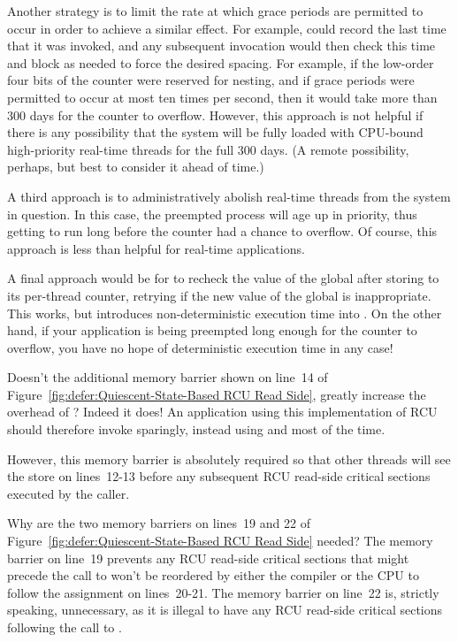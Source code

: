 \begin{enumerate}
	Another strategy is to limit the rate at which grace periods are
	permitted to occur in order to achieve a similar effect.
	For example,  could record the last time
	that it was invoked, and any subsequent invocation would then
	check this time and block as needed to force the desired
	spacing.
	For example, if the low-order four bits of the counter were
	reserved for nesting, and if grace periods were permitted to
	occur at most ten times per second, then it would take more
	than 300 days for the counter to overflow.
	However, this approach is not helpful if there is any possibility
	that the system will be fully loaded with CPU-bound high-priority
	real-time threads for the full 300 days.
	(A remote possibility, perhaps, but best to consider it ahead
	of time.)

	A third approach is to administratively abolish real-time threads
	from the system in question.
	In this case, the preempted process will age up in priority,
	thus getting to run long before the counter had a chance to
	overflow.
	Of course, this approach is less than helpful for real-time
	applications.

	A final approach would be for  to recheck
	the value of the global  after storing to its
	per-thread  counter, retrying if the new
	value of the global  is inappropriate.
	This works, but introduces non-deterministic execution time
	into .
	On the other hand, if your application is being preempted long
	enough for the counter to overflow, you have no hope of
	deterministic execution time in any case!


\QuickQ{}
	Doesn't the additional memory barrier shown on line~14 of
	Figure~\ref{fig:defer:Quiescent-State-Based RCU Read Side},
	greatly increase the overhead of ?
\QuickA{}
	Indeed it does!
	An application using this implementation of RCU should therefore
	invoke  sparingly, instead using
	 and  most of the
	time.

	However, this memory barrier is absolutely required so that
	other threads will see the store on lines~12-13 before any
	subsequent RCU read-side critical sections executed by the
	caller.

\QuickQ{}
	Why are the two memory barriers on lines~19 and 22 of
	Figure~\ref{fig:defer:Quiescent-State-Based RCU Read Side}
	needed?
\QuickA{}
	The memory barrier on line~19 prevents any RCU read-side
	critical sections that might precede the
	call to  won't be reordered by either
	the compiler or the CPU to follow the assignment on lines~20-21.
	The memory barrier on line~22 is, strictly speaking, unnecessary,
	as it is illegal to have any RCU read-side critical sections
	following the call to .


\end{enumerate}
